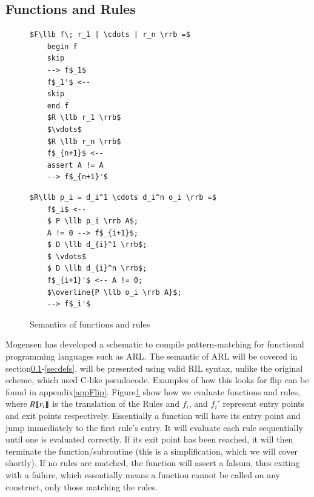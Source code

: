 \documentclass[a4paper]{article}
\begin{document}
\subsection{Functions and Rules}
\label{secrules}
\begin{figure}[!htb]
\begin{minipage}{0.4\textwidth}
\begin{lstlisting}
$F\llb f\; r_1 | \cdots | r_n \rrb =$
    begin f
    skip
    --> f$_1$
    f$_1'$ <--
    skip
    end f
    $R \llb r_1 \rrb$
    $\vdots$
    $R \llb r_n \rrb$
    f$_{n+1}$ <--
    assert A != A
    --> f$_{n+1}'$
\end{lstlisting}
\end{minipage}
\qquad
\begin{minipage}{0.4\textwidth}
\begin{lstlisting}
$R\llb p_i = d_i^1 \cdots d_i^n o_i \rrb =$
    f$_i$ <--
    $ P \llb p_i \rrb A$;
    A != 0 --> f$_{i+1}$;
    $ D \llb d_{i}^1 \rrb$;
    $ \vdots$
    $ D \llb d_{i}^n \rrb$;
    f$_{i+1}'$ <-- A != 0;
    $\overline{P \llb o_i \rrb A}$;
    --> f$_i'$
\end{lstlisting}
\end{minipage}
\caption{Semantics of functions and rules}
\label{rules}
\end{figure}

Mogensen has developed a schematic to compile pattern-matching for functional programming languages such as ARL\cite{patterns}. The semantic of ARL will be covered in section\ref{secrules}-\ref{secdefs},  will be presented using valid RIL syntax, unlike the original scheme, which used C-like pseudocode. Examples of how this looks for flip can be found in appendix\ref{appFlip}. Figure\ref{rules} show how we evaluate functions and rules, where \(R \llbracket r_i \rrbracket\) is the translation of the Rules and \(f_i\), and  \(f_i'\) represent entry points and exit points respectively. Essentially a function will have its entry point and jump immediately to the first rule's entry. It will evaluate each rule sequentially until one is evaluated correctly. If its exit point has been reached, it will then terminate the function/subroutine (this is a simplification, which we will cover shortly). If no rules are matched, the function will assert a falsum, thus exiting with a failure, which essentially means a function cannot be called on any construct, only those matching the rules.
\end{document}
